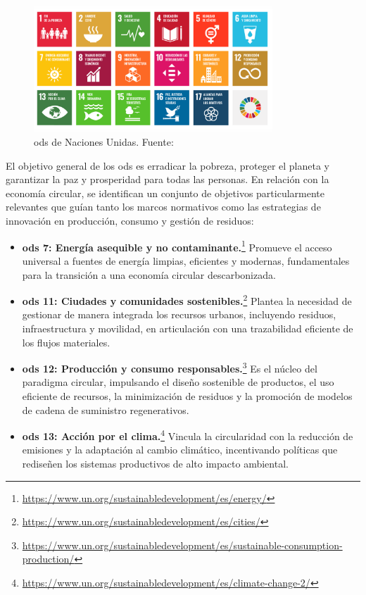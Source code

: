 \begin{figure}[!tb]
    \centering
    \includegraphics[width=0.8\textwidth]{Figures/ods.png}
    \caption[\acrfull{ods} de Naciones Unidas]{\acrfull{ods} de Naciones Unidas. Fuente: \cite{onu2024ods}}
    \label{fig:ods}
\end{figure}

El objetivo general de los \acrshort{ods} es erradicar la pobreza, proteger el planeta y garantizar la paz y prosperidad para todas las personas. En relación con la economía circular, se identifican un conjunto de objetivos particularmente relevantes que guían tanto los marcos normativos como las estrategias de innovación en producción, consumo y gestión de residuos:

\begin{itemize}
\item \textbf{\acrshort{ods} 7: Energía asequible y no contaminante.}\footnote{\url{https://www.un.org/sustainabledevelopment/es/energy/}} Promueve el acceso universal a fuentes de energía limpias, eficientes y modernas, fundamentales para la transición a una economía circular descarbonizada.
\item \textbf{\acrshort{ods} 11: Ciudades y comunidades sostenibles.}\footnote{\url{https://www.un.org/sustainabledevelopment/es/cities/}} Plantea la necesidad de gestionar de manera integrada los recursos urbanos, incluyendo residuos, infraestructura y movilidad, en articulación con una trazabilidad eficiente de los flujos materiales.
\item \textbf{\acrshort{ods} 12: Producción y consumo responsables.}\footnote{\url{https://www.un.org/sustainabledevelopment/es/sustainable-consumption-production/}} Es el núcleo del paradigma circular, impulsando el diseño sostenible de productos, el uso eficiente de recursos, la minimización de residuos y la promoción de modelos de cadena de suministro regenerativos.
\item \textbf{\acrshort{ods} 13: Acción por el clima.}\footnote{\url{https://www.un.org/sustainabledevelopment/es/climate-change-2/}} Vincula la circularidad con la reducción de emisiones y la adaptación al cambio climático, incentivando políticas que rediseñen los sistemas productivos de alto impacto ambiental.
\end{itemize}

